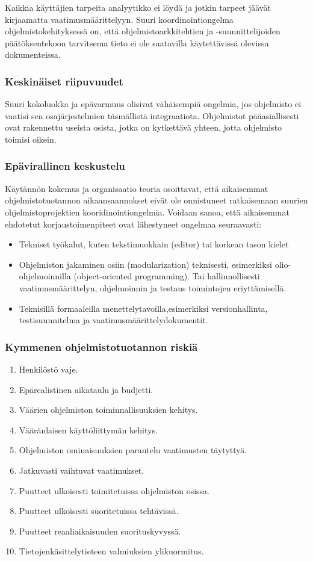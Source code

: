 \documentclass[finnish]{tktltiki2}
\theoremstyle{definition}
\theoremstyle{remark}
\begin{document}
Kaikkia käyttäjien tarpeita analyytikko ei löydä ja jotkin tarpeet jäävät kirjaamatta vaatimusmäärittelyyn. Suuri koordinointiongelma ohjelmistokehityksessä on, että ohjelmistoarkkitehtien ja -suunnittelijoiden päätöksentekoon tarvitsema tieto ei ole saatavilla käytettävissä olevissa dokumenteissa.\cite{KES95}

\subsubsection{Keskinäiset riipuvuudet}
Suuri kokoluokka ja epävarmuus olisivat vähäisempiä ongelmia, jos ohjelmisto ei vaatisi sen osajärjestelmien täsmällistä integraatiota. Ohjelmistot pääasiallisesti ovat rakennettu useista osista, jotka on kytkettävä yhteen, jotta ohjelmisto toimisi oikein.\cite{KES95}

\subsubsection{Epävirallinen keskustelu}
Käytännön kokemus ja organisaatio teoria osoittavat, että aikaisemmat ohjelmistotuotannon aikaansaannokset eivät ole onnistuneet ratkaisemaan suurien ohjelmistoprojektien kooridinointiongelmia. 
Voidaan sanoa, että aikaisemmat ehdotetut korjaustoimenpiteet ovat lähestyneet ongelmaa seuraavasti: 
\begin{itemize}
 \item Tekniset työkalut, kuten tekstimuokkain (editor) tai korkean tason kielet
 \item Ohjelmiston jakaminen osiin (modularization) teknisesti, esimerkiksi olio-ohjelmoinnilla (object-oriented programming). Tai hallinnollisesti vaatimusmäärittelyn, ohjelmoinnin ja testaus toimintojen eriyttämisellä.
 \item Teknisillä formaaleilla menettelytavoilla,esimerkiksi versionhallinta, testisuunnitelma ja vaatimusmäärittelydokumentit.
\end{itemize}
\subsubsection{Kymmenen ohjelmistotuotannon riskiä}

\begin{enumerate}
  \item Henkilöstö vaje.
  \item Epärealistinen aikataulu ja budjetti.
  \item Väärien ohjelmiston toiminnallisuuksien kehitys.
  \item Vääränlaisen käyttöliittymän kehitys.
  \item Ohjelmiston ominaisuuksien parantelu vaatimusten täytyttyä.
  \item Jatkuvasti vaihtuvat vaatimukset.
  \item Puutteet ulkoisesti toimitetuissa ohjelmiston osissa.
  \item Puutteet ulkoisesti suoritetuissa tehtävissä.
  \item Puutteet reaaliaikaisuuden suorituskyvyssä.
  \item Tietojenkäsittelytieteen valmiuksien ylikuormitus.
\end{enumerate}\cite{BOE88}
\end{document}
